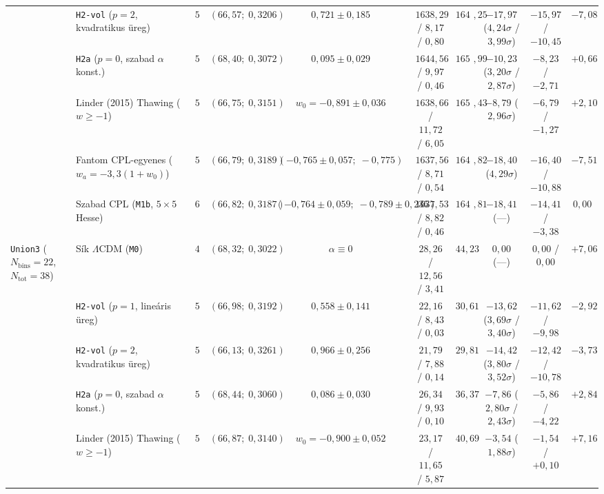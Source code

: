 \documentclass[11pt,a4paper]{article}
\begin{document}
\begin{table}[ht!]
{\begin{tabular}{llcccccccc}
 & \texttt{H2-vol} ($p=2$, kvadratikus \"ureg) & $5$ & $(66{,}57;\;0{,}3206)$ & $0{,}721 \pm 0{,}185$ & $1638{,}29$ / $8{,}17$ / $0{,}80$ & $1647{,}25$ & $-17{,}97$ ($4{,}24\sigma$ / $3{,}99\sigma$) & $-15{,}97$ / $-10{,}45$ & $-7{,}08$ \\
 & \texttt{H2a} ($p=0$, szabad $\alpha$ konst.) & $5$ & $(68{,}40;\;0{,}3072)$ & $0{,}095 \pm 0{,}029$ & $1644{,}56$ / $9{,}97$ / $0{,}46$ & $1654{,}99$ & $-10{,}23$ ($3{,}20\sigma$ / $2{,}87\sigma$) & $-8{,}23$ / $-2{,}71$ & $+0{,}66$ \\
 & Linder (2015) Thawing ($w \ge -1$) & $5$ & $(66{,}75;\;0{,}3151)$ & $w_0 = -0{,}891 \pm 0{,}036$ & $1638{,}66$ / $11{,}72$ / $6{,}05$ & $1656{,}43$ & $-8{,}79$ ($2{,}96\sigma$) & $-6{,}79$ / $-1{,}27$ & $+2{,}10$ \\
 & Fantom CPL-egyenes ($w_a=-3{,}3(1+w_0)$) & $5$ & $(66{,}79;\;0{,}3189)$ & $(-0{,}765 \pm 0{,}057;\;-0{,}775)$ & $1637{,}56$ / $8{,}71$ / $0{,}54$ & $1646{,}82$ & $-18{,}40$ ($4{,}29\sigma$) & $-16{,}40$ / $-10{,}88$ & $-7{,}51$ \\
 & Szabad CPL (\texttt{M1b}, $5\times 5$ Hesse) & $6$ & $(66{,}82;\;0{,}3187)$ & $(-0{,}764\pm 0{,}059;\;-0{,}789\pm 0{,}236)$ & $1637{,}53$ / $8{,}82$ / $0{,}46$ & $1646{,}81$ & $-18{,}41$ (---) & $-14{,}41$ / $-3{,}38$ & $0{,}00$ \\
\midrule
\texttt{Union3} ($N_{\mathrm{bins}}=22$, $N_{\mathrm{tot}}=38$) & S\'ik $\Lambda$CDM (\texttt{M0}) & $4$ & $(68{,}32;\;0{,}3022)$ & $\alpha \equiv 0$ & $28{,}26$ / $12{,}56$ / $3{,}41$ & $44{,}23$ & $0{,}00$ (---) & $0{,}00$ / $0{,}00$ & $+7{,}06$ \\
 & \texttt{H2-vol} ($p=1$, line\'aris \"ureg) & $5$ & $(66{,}98;\;0{,}3192)$ & $0{,}558 \pm 0{,}141$ & $22{,}16$ / $8{,}43$ / $0{,}03$ & $30{,}61$ & $-13{,}62$ ($3{,}69\sigma$ / $3{,}40\sigma$) & $-11{,}62$ / $-9{,}98$ & $-2{,}92$ \\
 & \texttt{H2-vol} ($p=2$, kvadratikus \"ureg) & $5$ & $(66{,}13;\;0{,}3261)$ & $0{,}966 \pm 0{,}256$ & $21{,}79$ / $7{,}88$ / $0{,}14$ & $29{,}81$ & $-14{,}42$ ($3{,}80\sigma$ / $3{,}52\sigma$) & $-12{,}42$ / $-10{,}78$ & $-3{,}73$ \\
 & \texttt{H2a} ($p=0$, szabad $\alpha$ konst.) & $5$ & $(68{,}44;\;0{,}3060)$ & $0{,}086 \pm 0{,}030$ & $26{,}34$ / $9{,}93$ / $0{,}10$ & $36{,}37$ & $-7{,}86$ ($2{,}80\sigma$ / $2{,}43\sigma$) & $-5{,}86$ / $-4{,}22$ & $+2{,}84$ \\
 & Linder (2015) Thawing ($w \ge -1$) & $5$ & $(66{,}87;\;0{,}3140)$ & $w_0 = -0{,}900 \pm 0{,}052$ & $23{,}17$ / $11{,}65$ / $5{,}87$ & $40{,}69$ & $-3{,}54$ ($1{,}88\sigma$) & $-1{,}54$ / $+0{,}10$ & $+7{,}16$ \\

\end{tabular}}
\end{table}
\end{document}
